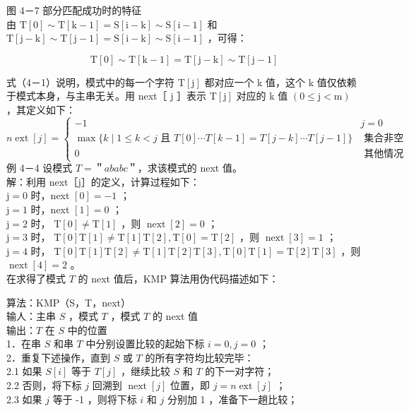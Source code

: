 \documentclass[10pt]{article}
\begin{document}
图 4－7 部分匹配成功时的特征\\
由 $\mathrm{T}[0] \sim \mathrm{T}[\mathrm{k}-1]=\mathrm{S}[\mathrm{i}-\mathrm{k}] \sim \mathrm{S}[\mathrm{i}-1]$ 和 $\mathrm{T}[\mathrm{j}-\mathrm{k}] \sim \mathrm{T}[\mathrm{j}-1]=\mathrm{S}[\mathrm{i}-\mathrm{k}] \sim \mathrm{S}[\mathrm{i}-1]$ ，可得：


\begin{equation*}
\mathrm{T}[0] \sim \mathrm{T}[\mathrm{k}-1]=\mathrm{T}[\mathrm{j}-\mathrm{k}] \sim \mathrm{T}[\mathrm{j}-1] \tag{4-1}
\end{equation*}


式（4－1）说明，模式中的每一个字符 $\mathrm{T}[\mathrm{j}]$ 都对应一个 k 值，这个 k 值仅依赖于模式本身，与主串无关。用 next［ j ］表示 $\mathrm{T}[\mathrm{j}]$ 对应的 k 值 $(0 \leqslant \mathrm{j}<\mathrm{m})$ ，其定义如下：\\
$n \operatorname{ext}[j]= \begin{cases}-1 & j=0 \\ \max \{k \mid 1 \leqslant k<j \text { 且 } T[0] \cdots T[k-1]=T[j-k] \cdots T[j-1]\} & \text { 集合非空 } \\ 0 & \text { 其他情况 }\end{cases}$\\
例 4－4 设模式 $T=$＂$a b a b c$＂，求该模式的 next 值。\\
解：利用 next［j］的定义，计算过程如下：\\
$\mathrm{j}=0$ 时，next $[0]=-1$ ；\\
$\mathrm{j}=1$ 时，next $[1]=0$ ；\\
$\mathrm{j}=2$ 时， $\mathrm{T}[0] \neq \mathrm{T}[1]$ ，则 $\operatorname{next}[2]=0$ ；\\
$\mathrm{j}=3$ 时， $\mathrm{T}[0] \mathrm{T}[1] \neq \mathrm{T}[1] \mathrm{T}[2], \mathrm{T}[0]=\mathrm{T}[2]$ ，则 $\operatorname{next}[3]=1$ ；\\
$\mathrm{j}=4$ 时， $\mathrm{T}[0] \mathrm{T}[1] \mathrm{T}[2] \neq \mathrm{T}[1] \mathrm{T}[2] \mathrm{T}[3], \mathrm{T}[0] \mathrm{T}[1]=\mathrm{T}[2] \mathrm{T}[3]$ ，则 $\operatorname{next}[4]=2$ 。\\
在求得了模式 $T$ 的 next 值后，KMP 算法用伪代码描述如下：

算法：KMP（S，T，next）\\
输人：主串 $S$ ，模式 $T$ ，模式 $T$ 的 next 值\\
输出：$T$ 在 $S$ 中的位置\\
1．在串 $S$ 和串 $T$ 中分别设置比较的起始下标 $i=0, j=0$ ；\\
2．重复下述操作，直到 $S$ 或 $T$ 的所有字符均比较完毕：\\
2.1 如果 $S[i]$ 等于 $T[j]$ ，继续比较 $S$ 和 $T$ 的下一对字符；\\
2.2 否则，将下标 $j$ 回溯到 $\operatorname{next}[j]$ 位置，即 $j=n \operatorname{ext}[j]$ ；\\
2.3 如果 $j$ 等于 -1 ，则将下标 $i$ 和 $j$ 分别加 1 ，准备下一趟比较；
\end{document}
